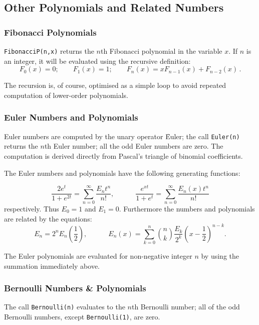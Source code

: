 \subsection{Other Polynomials and Related Numbers}

\subsubsection{Fibonacci Polynomials}
\hypertarget{FIBONACCIP}{}
\texttt{FibonacciP(n,x)} returns the $n$th Fibonacci polynomial
in the variable $x$. If $n$ is an integer, it will be
evaluated using the recursive definition:
\[F_0(x) = 0;\qquad F_1(x) = 1; \qquad F_n(x) = x F_{n-1}(x) + F_{n-2}(x)\,.\]

The recursion is, of course, optimised as a simple loop to avoid repeated
computation of lower-order polynomials.

\subsubsection{Euler Numbers and Polynomials}
\hypertarget{EULERP}{}
Euler numbers are computed by the unary operator \f{Euler}; the
call \texttt{Euler(n)} returns the $n$th Euler number; all the odd Euler
numbers are zero. The computation is
derived directly from Pascal's triangle of binomial coefficients.

The Euler numbers and polynomials have the following generating functions:

\[\frac {2e^t} {1+e^{2t}} = \sum_{n=0}^{\infty}\frac{E_nt^n}{n!},\qquad\quad
\frac {e^{x t}} {1+e^t} = \sum_{n=0}^{\infty}\frac{E_n(x)t^n}{n!}\]
respectively.  Thus $E_0=1$ and $E_1=0$. Furthermore the numbers and
polynomials are related by the equations:
\[ E_n = 2^nE_n\left(\frac{1}{2}\right),\qquad\quad
E_n(x) = \sum_{k=0}^n \binom{n}{k} \frac{E_k}{2^k} \left(x-\frac{1}{2}\right)^{n-k}.\]

The Euler polynomials are evaluated for non-negative integer $n$ by using
the summation immediately above.

\subsubsection{Bernoulli Numbers \& Polynomials}
\hypertarget{BERNOULLIP}{}
The call \texttt{Bernoulli(n)}
evaluates to the $n$th Bernoulli number;
all of the odd Bernoulli numbers, except \texttt{Bernoulli(1)}, are
zero.

